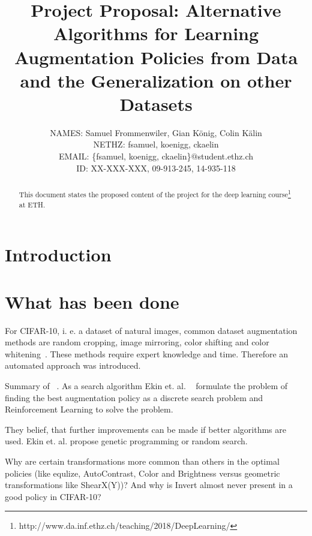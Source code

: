 \documentclass[10pt,twocolumn,letterpaper]{article}
\begin{document}
\title{Project Proposal: Alternative Algorithms for Learning Augmentation Policies from Data and the Generalization on other Datasets}

\author{
    	\small{NAMES: Samuel Frommenwiler, Gian K\"onig, Colin K\"alin} \\
   	\small{NETHZ: fsamuel, koenigg, ckaelin}\\
	\small{EMAIL: \{fsamuel, koenigg, ckaelin\}$@$student.ethz.ch}\\
    	\small{ID: XX-XXX-XXX, 09-913-245, 14-935-118}
}

\maketitle

\begin{abstract}
   This document states the proposed content of the project for the deep learning course\footnote{http://www.da.inf.ethz.ch/teaching/2018/DeepLearning/} at ETH.
\end{abstract}

\section{Introduction}

\section{What has been done}

For CIFAR-10, i. e. a dataset of natural images, common dataset augmentation methods are random cropping, image mirroring, color shifting and color whitening~\cite{Ekin}. These methods require expert knowledge and time. Therefore an automated approach was introduced.

Summary of ~\cite{Ekin}. As a search algorithm Ekin et. al. ~\cite{Ekin} formulate the problem of finding the best augmentation policy as a discrete search problem and Reinforcement Learning to solve the problem.

They belief, that further improvements can be made if better algorithms are used. Ekin et. al. propose genetic programming or random search.

Why are certain transformations more common than others in the optimal policies (like equlize, AutoContrast, Color and Brightness versus geometric transformations like ShearX(Y))? And why is Invert almost never present in a good policy in CIFAR-10?
\end{document}
